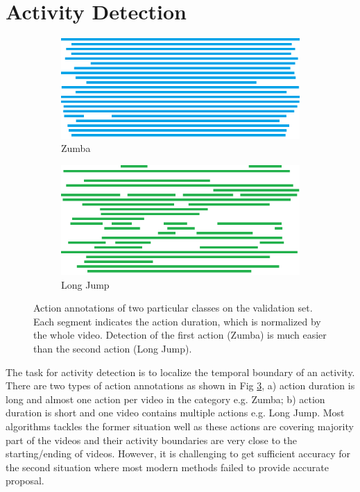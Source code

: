 \section{Activity Detection}
\label{sec:activity_detection}

\begin{figure}
    \centering
    \begin{subfigure}[b]{1\textwidth}
        \includegraphics[width=1\linewidth]{resources/Human_Poses/Zumba}
        \caption{Zumba}
        \label{fig:subfig1}
    \end{subfigure}

    \begin{subfigure}[b]{1\textwidth}
        \includegraphics[width=1\linewidth]{resources/Human_Poses/Long_jump}
        \caption{Long Jump}
        \label{fig:subfig2}
    \end{subfigure}
 \caption{Action annotations of two particular classes on the validation set. Each segment indicates the action duration, which is normalized by the whole video. Detection of the first action (Zumba) is much easier than the second action (Long Jump).}
 
\label{fig:seg} %
\end{figure}

The task for activity detection is to localize the temporal boundary of an activity. There are two types of action annotations as shown in Fig \ref{fig:seg}, a) action duration is long and almost one action per video in the category e.g. Zumba; b) action duration is short and one video contains multiple actions e.g. Long Jump. Most algorithms tackles the former situation well as these actions are covering majority part of the videos and their activity boundaries are very close to the starting/ending of videos. However, it is challenging to get sufficient accuracy for the second situation where most modern methods failed to provide accurate proposal.

